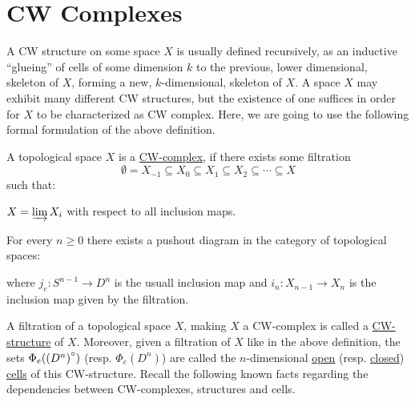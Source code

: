 \chapter{CW Complexes}

A CW structure on some space $X$ is usually defined recursively, as an inductive ``glueing'' of cells of some dimension $k$ to the previous, lower dimensional, skeleton of $X$, forming a new, $k$-dimensional, skeleton of $X$. A space $X$ may exhibit many different CW structures, but the existence of one suffices in order for $X$ to be characterized as CW complex. Here, we are going to use the following formal formulation of the above definition.

\begin{definition} A topological space $X$ is a \ul{CW-complex}, if there exists some filtration
\[\emptyset=X_{-1}\subseteq X_0\subseteq X_1\subseteq X_2\subseteq\cdots\subseteq X\]
such that:
\begin{b_item}
\item $X=\varinjlim X_i$ with respect to all inclusion maps.
\item For every $n\geq0$ there exists a pushout diagram in the category of topological spaces:
\begin{center}
\end{center}
where $j_e:S^{n-1}\to D^n$ is the usuall inclusion map and $i_n:X_{n-1}\to X_n$ is the inclusion map given by the filtration.
\end{b_item}
\end{definition}

A filtration of a topological space $X$, making $X$ a CW-complex is called a \ul{CW-structure} of $X$. Moreover, given a filtration of $X$ like in the above definition, the sets $\Phi_e\large({(D^n)}^{\circ}\large)$ (resp. $\Phi_e(D^n)$) are called the $n$-dimensional \ul{open} (resp. \ul{closed}) \ul{cells} of this CW-structure. Recall the following known facts regarding the dependencies between CW-complexes, structures and cells.

